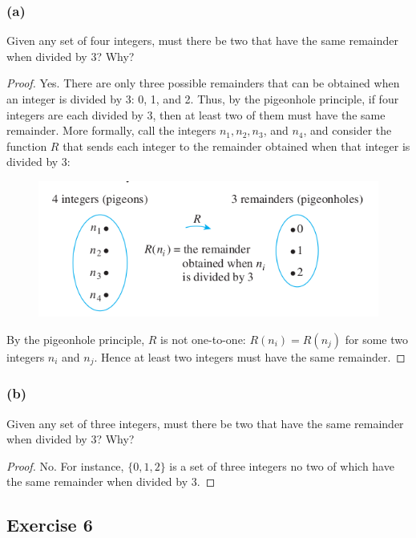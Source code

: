 \documentclass[14pt]{extarticle}
\begin{document}
\subsubsection{(a)}
Given any set of four integers, must there be two that have the same remainder when divided by 3? Why?

\begin{proof}
Yes. There are only three possible remainders that can be obtained when an integer is divided by 3: 0, 1, and 2. 
Thus, by the pigeonhole principle, if four integers are each divided by 3, then at least two of them must have the 
same remainder. More formally, call the integers \(n_1, n_2, n_3\), and \(n_4\), and consider the function \(R\) 
that sends each integer to the remainder obtained when that integer is divided by 3:

\begin{figure}[ht!]
\centering
\includegraphics[scale=0.4]{../images/9.4.5.a.png}
\end{figure}

By the pigeonhole principle, \(R\) is not one-to-one: \(R(n_i) = R(n_j)\) for some two integers \(n_i\) and 
\(n_j\). Hence at least two integers must have the same remainder.
\end{proof}

\subsubsection{(b)}
Given any set of three integers, must there be two that have the same remainder when divided by 3? Why?

\begin{proof}
No. For instance, \(\{0, 1, 2\}\) is a set of three integers no two of which have the same remainder when 
divided by 3.
\end{proof}

\subsection{Exercise 6}
\end{document}
